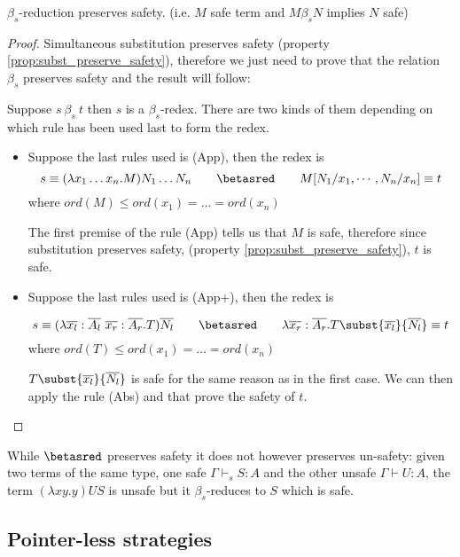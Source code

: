 \documentclass{article}
\begin{document}
\begin{lem}
$\beta_s$-reduction preserves safety.
(i.e. $M$ safe term and $M \beta_s N$ implies $N$ safe)
\end{lem}


\begin{proof}
Simultaneous substitution preserves safety (property \ref{prop:subst_preserve_safety}), therefore we just need to prove that
the relation $\beta_s$ preserves safety and the result will follow:

 Suppose $s\ \beta_s\ t$ then $s$ is a $\beta_s$-redex. There are two kinds of them
 depending on which rule has been used last to form the redex.

\begin{itemize}
\item Suppose the last rules used is (App), then the redex is
$$s \equiv (\lambda x_1 \ldots x_n . M) N_1 \ldots N_n \qquad \betasred \qquad M[N_1 / x_1 , \cdots, N_n / x_n] \equiv t$$
where $ord(M) \leq ord(x_1) = \ldots = ord(x_n)$

The first premise of the rule (App) tells us that $M$ is safe, therefore since substitution preserves safety,
(property \ref{prop:subst_preserve_safety}), $t$ is safe.

\item Suppose the last rules used is (App+), then the redex is

 $$
s \equiv  (\lambda \overline{x_l} : \overline{A_l} \  \overline{x_r}: \overline{A_r} . T) \overline{N_l}
\qquad \betasred \qquad
\lambda \overline{x_r}: \overline{A_r} . T\subst{\overline{x_l}}{\overline{N_l}} \equiv  t
$$
where $ord(T) \leq ord(x_1) = \ldots = ord(x_n)$

$T\subst{\overline{x_l}}{\overline{N_l}}$ is safe for the same reason as in the first case.
We can then apply the rule (Abs) and that prove the safety of $t$.
\end{itemize}
\end{proof}



\begin{rem}
\label{rem:betasred_notpreserv_unsafety} While $\betasred$ preserves
safety it does not however preserves un-safety: given two terms of
the same type, one safe $\Gamma \vdash_s S : A$ and the other unsafe
$\Gamma \vdash U : A$, the term $(\lambda x y . y) U S$ is unsafe
but it $\beta_s$-reduces to $S$ which is safe.
\end{rem}

\subsection{Pointer-less strategies}
\label{subsec:ptrless_strat}
\end{document}
